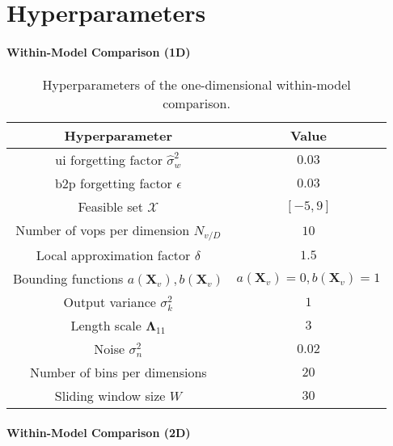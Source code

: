 \chapter{Hyperparameters}

\subsubsection{Within-Model Comparison (1D)}

\bgroup
\def\arraystretch{1}
\begin{table}[h]
    \small
    \centering
    \begin{tabular}{c||c}
        \textbf{Hyperparameter} & \textbf{Value} \\\hline\hline
        \gls{ui} forgetting factor $\hat{\sigma}_w^2$ & $0.03$\\
        \gls{b2p} forgetting factor $\epsilon$ & $0.03$\\
        Feasible set $\mathcal{X}$ & $[-5,9]$\\
        Number of \glspl{vop} per dimension $N_{v/D}$ & $10$\\
        Local approximation factor $\delta$ & $1.5$\\
        Bounding functions $a(\mathbf{X}_v),b(\mathbf{X}_v)$ & $a(\mathbf{X}_v)=0,b(\mathbf{X}_v)=1$\\
        Output variance $\sigma_k^2$ & $1$\\
        Length scale $\boldsymbol\Lambda_{11}$ & $3$\\
        Noise $\sigma_n^2$ & $0.02$ \\
        Number of bins per dimensions & $20$\\
        Sliding window size $W$ & $30$
    \end{tabular}
    \caption{Hyperparameters of the one-dimensional within-model comparison.}
    \label{tab:params_WMC_1D}
\end{table}
\egroup

\subsubsection{Within-Model Comparison (2D)}

